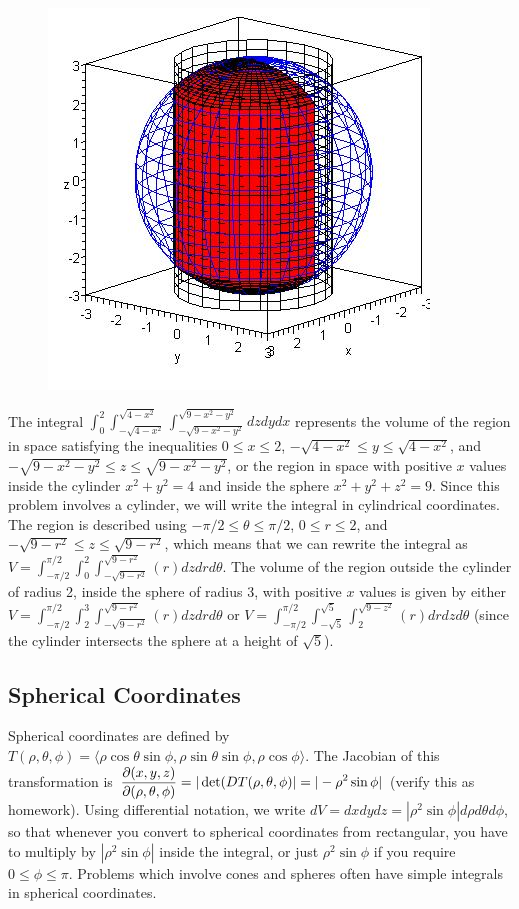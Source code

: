 \begin{figure}
\newcommand{\myheight}{.8in}
\includegraphics[height=\myheight]{10-SurfaceTripleIntegrals/support/cylindrical-2}
\end{figure}
The integral
$\int_0^2\int_{-\sqrt{4-x^2}}^{\sqrt{4-x^2}}\int_{-\sqrt{9-x^2-y^2}}^{\sqrt{9-x^2-y^2}}dzdydx$
represents the volume of the region in space satisfying the
inequalities $0\leq x\leq 2$, ${-\sqrt{4-x^2}}\leq y\leq {\sqrt{4-x^2}}$, and
${-\sqrt{9-x^2-y^2}}\leq z\leq{\sqrt{9-x^2-y^2}}$, or the region in space
with positive $x$ values inside the cylinder $x^2+y^2=4$ and inside
the sphere $x^2+y^2+z^2=9$. Since this problem involves a cylinder, we
will write the integral in cylindrical coordinates.  The region is
described using $-\pi/2\leq \theta\leq \pi/2$, $0\leq r\leq 2$, and $-\sqrt{9-r^2}\leq z\leq 
\sqrt{9-r^2}$, which means that we can rewrite the integral as $V=
\int_{-\pi/2}^{\pi/2}\int_0^2\int_{-\sqrt{9-r^2}}^{\sqrt{9-r^2}}(r)dzdrd\theta $. The
volume of the region outside the cylinder of radius 2, inside the
sphere of radius 3, with positive $x$ values is given by either $V=
\int_{-\pi/2}^{\pi/2}\int_2^3\int_{-\sqrt{9-r^2}}^{\sqrt{9-r^2}}(r)dzdrd\theta $ or $V=
\int_{-\pi/2}^{\pi/2}\int_{-\sqrt 5}^{\sqrt{5}}\int_{2}^{\sqrt{9-z^2}}(r)drdzd\theta $
(since the cylinder intersects the sphere at a height of $\sqrt 5$).



\subsection{Spherical Coordinates}
Spherical coordinates are defined by $T(\rho,\theta,\phi) = \langle\rho\cos\theta\sin\phi,
\rho\sin\theta\sin\phi,\rho\cos\phi\rangle$.  The Jacobian of this transformation is $\displaystyle
\frac{\partial(x,y,z)}{\partial(\rho,\theta,\phi)} = |\det(DT(\rho,\theta,\phi)| = |-\rho^2\sin\phi|$ (verify
this as homework). Using differential notation, we write
$dV=dxdydz=|\rho^2\sin\phi|d\rho d\theta d\phi$, so that whenever you convert to
spherical coordinates from rectangular, you have to multiply by
$|\rho^2\sin\phi|$ inside the integral, or just $\rho^2\sin\phi$ if you require
{$0\leq \phi\leq \pi$}. Problems which involve cones and spheres often have
simple integrals in spherical coordinates.

